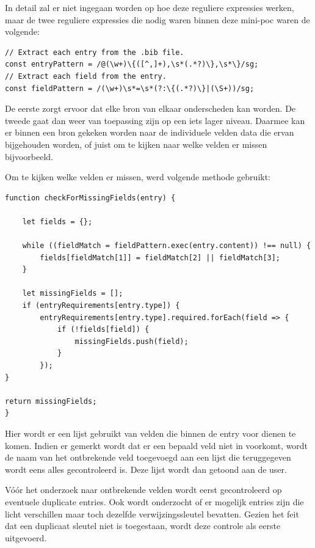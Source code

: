 In detail zal er niet ingegaan worden op hoe deze reguliere expressies werken, maar de twee reguliere expressies die nodig waren binnen deze mini-poc waren de volgende:
\begin{verbatim}
// Extract each entry from the .bib file.
const entryPattern = /@(\w+)\{([^,]+),\s*(.*?)\},\s*\}/sg;
// Extract each field from the entry.
const fieldPattern = /(\w+)\s*=\s*(?:\{(.*?)\}|(\S+))/sg;
\end{verbatim}

De eerste zorgt ervoor dat elke bron van elkaar onderscheden kan worden. De tweede gaat dan weer van toepassing zijn op een iets lager niveau. Daarmee kan er binnen een bron gekeken worden naar de individuele velden data die ervan bijgehouden worden, of juist om te kijken naar welke velden er missen bijvoorbeeld.

Om te kijken welke velden er missen, werd volgende methode gebruikt:

\begin{verbatim}
function checkForMissingFields(entry) {

    let fields = {};

    while ((fieldMatch = fieldPattern.exec(entry.content)) !== null) {
        fields[fieldMatch[1]] = fieldMatch[2] || fieldMatch[3];
    }

    let missingFields = [];
    if (entryRequirements[entry.type]) {
        entryRequirements[entry.type].required.forEach(field => {
            if (!fields[field]) {
                missingFields.push(field);
            }
        });
}

return missingFields;
}
\end{verbatim}
Hier wordt er een lijst gebruikt van velden die binnen de entry voor dienen te komen. Indien er gemerkt wordt dat er een bepaald veld niet in voorkomt, wordt de naam van het ontbrekende veld toegevoegd aan een lijst die teruggegeven wordt eens alles gecontroleerd is. Deze lijst wordt dan getoond aan de user.

Vóór het onderzoek naar ontbrekende velden wordt eerst gecontroleerd op eventuele duplicate entries. Ook wordt onderzocht of er mogelijk entries zijn die licht verschillen maar toch dezelfde verwijzingssleutel bevatten. Gezien het feit dat een duplicaat sleutel niet is toegestaan, wordt deze controle als eerste uitgevoerd.

